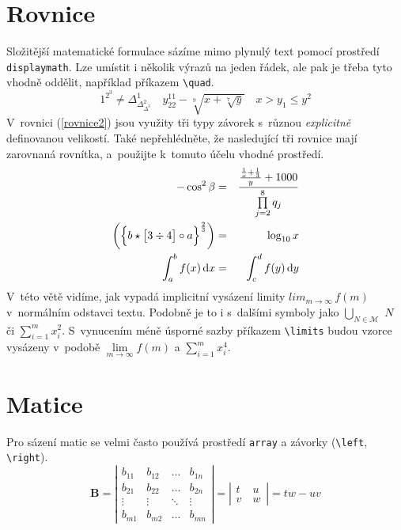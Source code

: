 \documentclass[a4paper, 11pt, twocolumn]{article}
\begin{document}
\section{Rovnice}
    Složitější matematické formulace sázíme mimo plynulý text pomocí prostředí \verb|displaymath|. Lze umístit i několik výrazů na jeden řádek, ale pak je třeba tyto vhodně oddělit, například příkazem \verb|\quad|.  
    \begin{displaymath}
        1^{2^{3}} \neq \Delta^{1}_{\Delta^{2}_{\Delta^{3}}} \quad
        y^{11}_{22}-\sqrt[9]{x+\sqrt[7]{y}} \quad
        x>y_{1}\leq y^{2}
    \end{displaymath}
    \noindent V~rovnici (\ref{rovnice2}) jsou využity tři typy závorek s~různou \textit{explicitně} definovanou velikostí. Také nepřehlédněte, že nasledující tři rovnice mají zarovnaná rovnítka, a~použijte k~tomuto účelu vhodné prostředí.
    \begin{eqnarray} 
        -\cos^{2}\beta &=& \frac{\frac{\frac{1}{x}+\frac{1}{3}}{y}+1000}{\prod\limits_{j=2}^{8}q_j} \\  
        \biggl(\Bigl\{b\star\bigl[3\div4\bigr]\circ a\Bigr\}^{\frac{2}{3}}\biggr) &=&  \log_{10}x\label{rovnice2} \\
        \int_{a}^{b} f(x)\,\textrm{d}x &=& \int_{c}^{d} f(y)\,\textrm{d}y\label{rovnice3}
    \end{eqnarray} 
    \noindent V~této větě vidíme, jak vypadá implicitní vysázení limity $lim_{m\rightarrow \infty } \,f(m)$ v~normálním odstavci textu. Podobně je to i s~dalšími symboly jako $\bigcup_{N \in \mathcal{M}}$ $N$ či $\sum_{i=1}^m x_i^2$.
    S~vynucením méně úsporné sazby příkazem \verb-\limits- budou vzorce vysázeny v~podobě $\lim\limits_{m\rightarrow\infty} f(m)$ a $\sum\limits _{i=1}^m x_i^4$.

\section{Matice}
    Pro sázení matic se velmi často používá prostředí \texttt{array}
    a závorky (\verb|\left|, \verb|\right|).    
    $$ 
        \mathbf{B} = \left \vert 
        \begin{array}{cccc}
            b_{11} & b_{12} & \dots & b_{1n}\\
            b_{21} & b_{22} & \dots & b_{2n}\\
            \vdots & \vdots & \ddots & \vdots\\
            b_{m1} & b_{m2} & \dots & b_{mn}
        \end{array} 
        \right \vert = \left \vert 
        \begin{array}{cc}
            t & u~\\
            v~& w 
        \end{array} \right \vert
        = tw - uv
    $$ 
    
\end{document}
